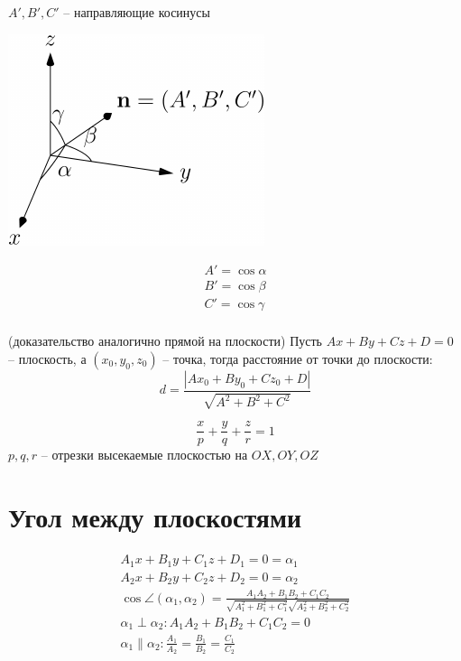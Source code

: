$A', B', C'$ -- направляющие косинусы

\noindent\begin{minipage}{.45\textwidth}
    \begin{center}
        \includegraphics{figures/directional_cosines.pdf}
    \end{center}
\end{minipage}
\begin{minipage}{.45\textwidth}
    \begin{gather*}
        A' = \cos \alpha\\
        B' = \cos \beta\\
        C' = \cos \gamma\\
    \end{gather*}
\end{minipage}

\begin{theorem} (доказательство аналогично прямой на плоскости)
            Пусть $Ax + By + Cz + D = 0$ -- плоскость, а $(x_0, y_0, z_0)$ -- точка,
              тогда расстояние от точки до плоскости:
              \[d = \frac{|Ax_0 + By_0 + Cz_0 + D|}{\sqrt{A^2 + B^2 + C^2}}\]
\end{theorem}

\begin{definition}
    \[\frac{x}{p} + \frac{y}{q} + \frac{z}{r} = 1\]
    $p,q,r$ -- отрезки высекаемые плоскостью на $OX, OY, OZ$
\end{definition}


\section{Угол между плоскостями}

\begin{definition}
    \begin{gather*}
        A_1x + B_1 y + C_1 z + D_1 = 0 = \alpha_1\\
        A_2x + B_2 y + C_2 z + D_2 = 0 = \alpha_2\\
        \cos\angle(\alpha_1, \alpha_2) =
        \frac{A_1 A_2 + B_1 B_2 + C_1 C_2}{\sqrt{A_1^2 + B_1^2 + C_1^2}\sqrt{A_2^2 + B_2^2 + C_2^2}}\\
        \alpha_1 \perp \alpha_2: A_1 A_2 + B_1 B_2 + C_1 C_2 = 0\\
        \alpha_1 \parallel \alpha_2: \frac{A_1}{A_2} = \frac{B_1}{B_2} = \frac{C_1}{C_2}
    \end{gather*}
\end{definition}


